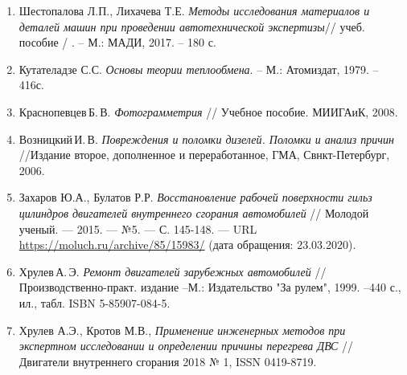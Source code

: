 \begin{enumerate}
%
%
% 
%
%
\item 
Шестопалова Л.П., Лихачева Т.Е. \emph{Методы исследования материалов и деталей машин при проведении автотехнической экспертизы}// учеб. пособие /
. – М.: МАДИ, 2017. – 180 с.
%
\item  
Кутателадзе С.С. \emph{Основы теории теплообмена}. – М.: Атомиздат, 1979. – 416с.
%
%
%
\item 
Краснопевцев\,Б.\,В. \emph{Фотограмметрия} // Учебное пособие. МИИГАиК, 2008.
%
\item
Возницкий\,И.\,В. \emph{Повреждения и поломки дизелей. Поломки и анализ причин} //Издание второе, дополненное и переработанное, ГМА, Свнкт-Петербург, 2006.
%
%
\item 
Захаров Ю.А., Булатов Р.Р. \emph{Восстановление рабочей поверхности гильз цилиндров двигателей внутреннего сгорания автомобилей} // Молодой ученый. — 2015. — №5. — С. 145-148. — URL \url{https://moluch.ru/archive/85/15983/} (дата обращения: 23.03.2020).
%
%
\item 
Хрулев\,А.\,Э. \emph{Ремонт двигателей зарубежных автомобилей} // Производственно-практ. издание --М.: Издательство "За рулем", 1999. --440 с., ил., табл.  ISBN 5-85907-084-5.
%
\item  
Хрулев А.Э., Кротов М.В., \emph{Применение инженерных методов при экспертном исследовании и определении причины перегрева ДВС} // Двигатели внутреннего сгорания 2018 № 1, ISSN 0419-8719.
%


\end{enumerate}
